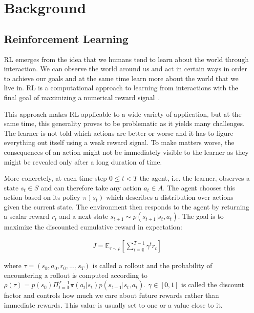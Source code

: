 \chapter{Background}
\label{ch:background}

\section{Reinforcement Learning}
\label{sec:background_rl}

\ac{RL} emerges from the idea that we humans tend to learn about the world through interaction. We can observe the world around us and act in certain ways in order to achieve our goals and at the same time learn more about the world that we live in. \ac{RL} is a computational approach to learning from interactions with the final goal of maximizing a numerical reward signal \cite{rlbook}.

This approach makes \ac{RL} applicable to a wide variety of application, but at the same time, this generality proves to be problematic as it yields many challenges. The learner is not told which actions are better or worse and it has to figure everything out itself using a weak reward signal. To make matters worse, the consequences of an action might not be immediately visible to the learner as they might be revealed only after a long duration of time.


More concretely, at each time-step $0 \leq t < T$ the agent, i.e. the learner, observes a state $s_t \in \mathit{S}$ and can therefore take any action $a_t \in \mathit{A}$. The agent chooses this action based on its policy $\pi(s_t)$ which describes a distribution over actions given the current state.
The environment then responds to the agent by returning a scalar reward $r_t$ and a next state $s_{t+1} \sim p(s_{t+1}|s_t, a_t)$. The goal is to maximize the discounted cumulative reward in expectation:

\begin{align}
    J = \mathbb{E}_{\tau \sim \rho} \left[ \sum_{i=0}^{T-1} \gamma^t r_t \right]
\end{align}

where $\tau = (s_0, a_0, r_0, \dots, s_T)$ is called a rollout and the probability of encountering a rollout is computed according to $\rho(\tau) = p(s_0) \Pi_{t=0}^{T-1} \pi(a_t|s_t) p(s_{t+1}|s_t,a_t)$. $\gamma \in [0,1]$ is called the discount factor and controls how much we care about future rewards rather than immediate rewards. This value is usually set to one or a value close to it.

